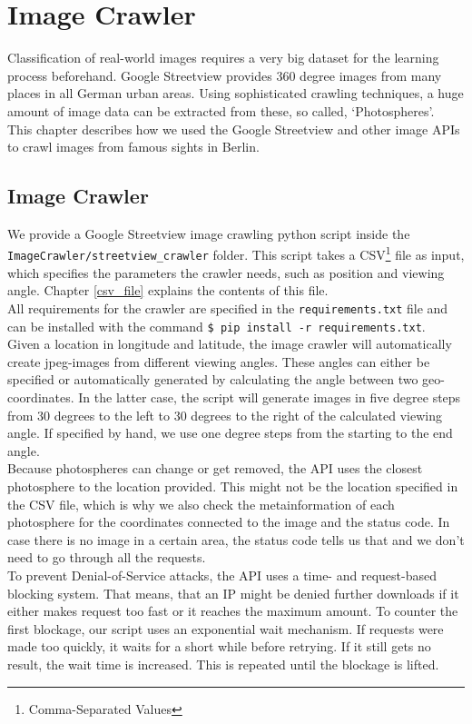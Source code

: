 \section{Image Crawler}
Classification of real-world images requires a very big dataset for the learning process beforehand. Google Streetview provides 360 degree images from many places in all German urban areas. Using sophisticated crawling techniques, a huge amount of image data can be extracted from these, so called, `Photospheres'.\\
This chapter describes how we used the Google Streetview and other image APIs to crawl images from famous sights in Berlin.

\subsection{Image Crawler}
We provide a Google Streetview image crawling python script inside the\\\texttt{ImageCrawler/streetview_crawler} folder. This script takes a CSV\footnote{Comma-Separated Values} file as input, which specifies the parameters the crawler needs, such as position and viewing angle. Chapter \ref{csv_file} explains the contents of this file.\\
All requirements for the crawler are specified in the \texttt{requirements.txt} file and can be installed with the command \texttt{\$ pip install -r requirements.txt}.\\
Given a location in longitude and latitude, the image crawler will automatically create jpeg-images from different viewing angles. These angles can either be specified or automatically generated by calculating the angle between two geo-coordinates. In the latter case, the script will generate images in five degree steps from 30 degrees to the left to 30 degrees to the right of the calculated viewing angle. If specified by hand, we use one degree steps from the starting to the end angle.\\
Because photospheres can change or get removed, the API uses the closest photosphere to the location provided. This might not be the location specified in the CSV file, which is why we also check the metainformation of each photosphere for the coordinates connected to the image and the status code. In case there is no image in a certain area, the status code tells us that and we don't need to go through all the requests.\\
To prevent Denial-of-Service attacks, the API uses a time- and request-based blocking system. That means, that an IP might be denied further downloads if it either makes request too fast or it reaches the maximum amount. To counter the first blockage, our script uses an exponential wait mechanism. If requests were made too quickly, it waits for a short while before retrying. If it still gets no result, the wait time is increased. This is repeated until the blockage is lifted.\\
